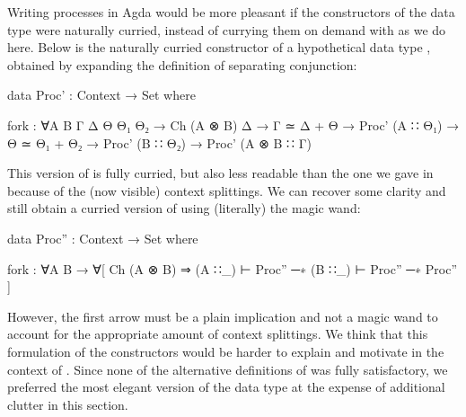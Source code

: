 \begin{remark}
    \label{rem:curry}
    Writing processes in Agda would be more pleasant if the constructors of the
    data type  were naturally curried, instead of currying
    them on demand with  as we do here.
    Below is the naturally curried constructor 
    of a hypothetical data type , obtained by expanding the
    definition of separating conjunction:
\begin{code}[hide]
data Proc' : Context → Set where
\end{code}
\begin{code}
  fork : ∀{A B Γ Δ Θ Θ₁ Θ₂} → Ch (A ⊗ B) Δ → Γ ≃ Δ + Θ →
         Proc' (A ∷ Θ₁) → Θ ≃ Θ₁ + Θ₂ → Proc' (B ∷ Θ₂) → Proc' (A ⊗ B ∷ Γ)
\end{code}

    This version of  is fully curried, but also
    less readable than the one we gave in  because of the
    (now visible) context splittings. We can recover some clarity and still
    obtain a curried version of  using
    (literally) the magic wand:
\begin{code}[hide]
data Proc'' : Context → Set where
\end{code}
\begin{code}
  fork : ∀{A B} →
         ∀[ Ch (A ⊗ B) ⇒ (A ∷_) ⊢ Proc'' ─∗ (B ∷_) ⊢ Proc'' ─∗ Proc'' ]
\end{code}

    However, the first arrow must be a plain implication  and
    not a magic wand to account for the appropriate amount of context
    splittings. We think that this formulation of the constructors would be
    harder to explain and motivate in the context of .
    Since none of the alternative definitions of  was fully
    satisfactory, we preferred the most elegant version of the data type at the
    expense of additional clutter in this section.
    \eoe
\end{remark}
